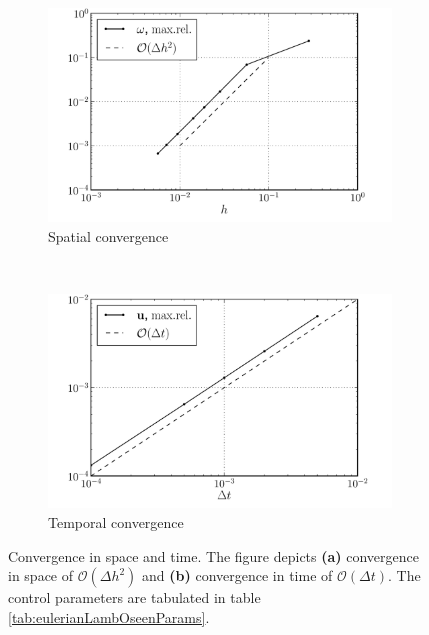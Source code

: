 	\begin{figure}[p]
        \centering
        \begin{subfigure}[b]{0.5\textwidth}
                \includegraphics[width=\textwidth]{figures/eulerian/lambOseen_eulerianConvergence_dx_compressed.pdf}
                \caption{Spatial convergence}
                \label{fig:lambOseen_eulerianConvergence_dx}
        \end{subfigure}%
        ~ %
        \begin{subfigure}[b]{0.5\textwidth}
                \includegraphics[width=\textwidth]{figures/eulerian/lambOseen_eulerianConvergence_dt_compressed.pdf}
                \caption{Temporal convergence}
                \label{fig:lambOseen_eulerianConvergence_dt}
        \end{subfigure}
        \caption{Convergence in space and time. The figure depicts \textbf{(a)} convergence in space of $\mathcal{O}(\Delta h^2)$ and \textbf{(b)} convergence in time of $\mathcal{O}(\Delta t)$. The control parameters are tabulated in table \ref{tab:eulerianLambOseenParams}.}
        \label{fig:lambOseen_eulerianConvergence}
	\end{figure}		
	

